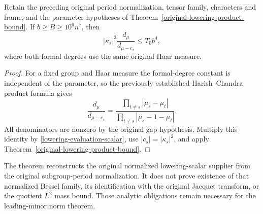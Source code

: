 \begin{theorem}\label{original-normalized-lowering-bound}
Retain the preceding original period normalization, tensor family,
characters and frame, and the parameter hypotheses of
Theorem~\ref{original-lowering-product-bound}.  If
$b\ge B\ge10^6n^7$, then
\[
            |\kappa_s|^2\frac{d_\mu}{d_{\mu-e_s}}\le T_0b^4,
\]
where both formal degrees use the same original Haar measure.
\end{theorem}
\begin{proof}
For a fixed group and Haar measure the formal-degree constant is
independent of the parameter, so the previously established
Harish--Chandra product formula gives
\[
 \frac{d_\mu}{d_{\mu-e_s}}
       =\frac{\prod_{t\ne s}|\mu_s-\mu_t|}
                    {\prod_{t\ne s}|\mu_s-1-\mu_t|}.
\]
All denominators are nonzero by the original gap hypothesis.  Multiply
this identity by \eqref{lowering-evaluation-scalar}, use
$|c_s|=|\kappa_s|^2$, and apply
Theorem~\ref{original-lowering-product-bound}.
\end{proof}

The theorem reconstructs the original normalized lowering-scalar
supplier from the original subgroup-period normalization.  It does
not prove existence of that normalized Bessel family, its identification
with the original Jacquet transform, or the quotient $L^2$ mass bound.
Those analytic obligations remain necessary for the leading-minor
norm theorem.
